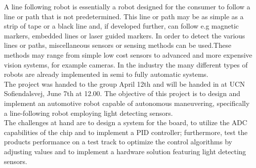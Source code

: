 A line following robot is essentially a robot designed for the consumer to follow a line or path that is not predetermined. This line or path may be as simple as a strip of tape or a black line and, if  developed further, can follow e.g magnetic markers, embedded lines or laser guided markers. In order to detect the various lines or paths, miscellaneous sensors or sensing methods can be used.\newline These methods may range from simple low cost sensors to advanced and more expensive vision systems, for example cameras. In the industry the many different types of robots are already implemented in semi to fully automatic systems.\\

The project was handed to the group April 12th and will be handed in at UCN Sofiendalsvej, June 7th at 12.00.\newline
The objective of this project is to design and implement an automotive robot capable of autonomous maneuvering, specifically a line-following robot employing light detecting sensors.  \\
The challenges at hand are to design a system for the board, to utilize the ADC capabilities of the chip and to implement a PID controller; furthermore, test the products performance on a test track to optimize the control algorithms by adjusting values and to implement a hardware solution featuring light detecting sensors.
